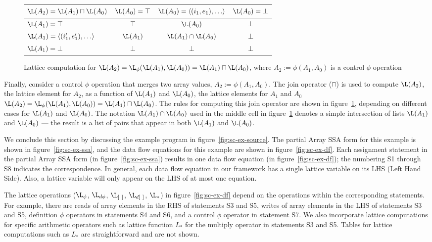 \begin{figure}%
\begin{center}
\begin{tabular}{|l||c|c|c|}
\hline
$\L(A_2) = \L(A_1) \sqcap \L(A_0) $ & $\L(A_0) = \top$ & $\L(A_0) = \langle (i_1,e_1), \ldots \rangle $ & $\L(A_0) = \bot$ \\
\hline \hline
$\L(A_1) = \top$ & $\top$ & $\L(A_0)$ & $\bot$ \\
\hline
$\L(A_1) = \langle(i'_1,e'_1), \ldots\rangle$ & $\L(A_1)$ & $\L(A_1) \cap \L(A_0)$ & $\bot$ \\
\hline
$\L(A_1) = \bot$ & $\bot$ & $\bot$ & $\bot$ \\
\hline
\end{tabular}
\end{center}
\caption{Lattice computation for 
$\L(A_2) = \L_{\phi}(\L(A_1), \L(A_0)) = \L(A_1) \sqcap \L(A_0) $,
where $A_2 := \phi(A_1, A_0)$ is
a control $\phi$ operation}
\label{fig:join}
\end{figure}

Finally,
consider a control $\phi$ operation that merges two array values, $A_2 := \phi(A_1, A_0)$.
The join operator ($\sqcap$) is used to compute $\L(A_2)$,
the lattice element for $A_2$, as a function of 
$\L(A_1)$ and $\L(A_0)$,
the lattice elements for $A_1$ and $A_0$ 
\ie\ $\L(A_2) = \L_{\phi}(\L(A_1), \L(A_0)) = \L(A_1) \sqcap \L(A_0)$.
The rules for computing this
join operator are shown in figure~\ref{fig:join}, depending on
different cases for $\L(A_1)$ and $\L(A_0)$.
The notation $\L(A_1) \cap \L(A_0)$ used in the middle cell in
figure~\ref{fig:join} denotes a simple intersection of lists $\L(A_1)$ and 
$\L(A_0)$  --- the result is a list of pairs that appear in both
$\L(A_1)$ and 
$\L(A_0)$.


We conclude this section by discussing the
example program in figure~\ref{fig:sc-ex-source}.  The
partial Array SSA form for this example is shown in
figure~\ref{fig:sc-ex-ssa}, and 
the data
flow equations for this example are shown in
figure~\ref{fig:sc-ex-df}. Each assignment statement
in the partial Array SSA form
(in figure~\ref{fig:sc-ex-ssa})
results in one data flow equation
(in figure~\ref{fig:sc-ex-df}); the numbering S1 through S8
indicates the correspondence.
In general, each data flow equation in our framework has a
single lattice variable on its LHS (Left Hand Side).  Also, a lattice
variable will only appear on the LHS of at most one equation.

The lattice operations ($\L_{\phi}$, $\L_{d\phi}$,  $\L_{[\ ]}$, $\L_{d[\ ]}$,
$\L_*$)
in figure~\ref{fig:sc-ex-df}
depend on the
operations within the corresponding
statements. For example, there are
reads of array elements in the RHS of statements S3 and S5, writes of 
array elements in the LHS of statements S3 and S5, 
definition $\phi$ operators in statements S4 and S6, and a control
$\phi$ operator in statement S7.
We also incorporate lattice computations 
for specific
arithmetic operators such as lattice function $L_*$ for
the multiply operator
in statements S3 and S5. Tables for
lattice computations such as $L_*$ 
are straightforward and are not shown. 


